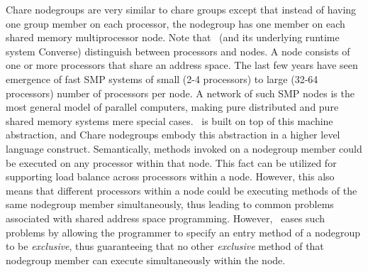 Chare nodegroups are very similar to chare groups except that instead of having
one group member on each processor, the nodegroup has one member on each shared
memory multiprocessor node. Note that \charmpp\ (and its underlying runtime
system Converse) distinguish between processors and nodes. A node consists of
one or more processors that share an address space. The last few years have
seen emergence of fast SMP systems of small (2-4 processors) to large (32-64
processors) number of processors per node. A network of such SMP nodes is the
most general model of parallel computers, making pure distributed and pure
shared memory systems mere special cases. \charmpp\ is built on top of this
machine abstraction, and Chare nodegroups embody this abstraction in a higher
level language construct. Semantically, methods invoked on a nodegroup member
could be executed on any processor within that node. This fact can be utilized
for supporting load balance across processors within a node. However, this also
means that different processors within a node could be executing methods of the
same nodegroup member simultaneously, thus leading to common problems
associated with shared address space programming. However, \charmpp\ eases such
problems by allowing the programmer to specify an entry method of a nodegroup
to be {\em exclusive}, thus guaranteeing that no other {\em exclusive} method
of that nodegroup member can execute simultaneously within the node.

